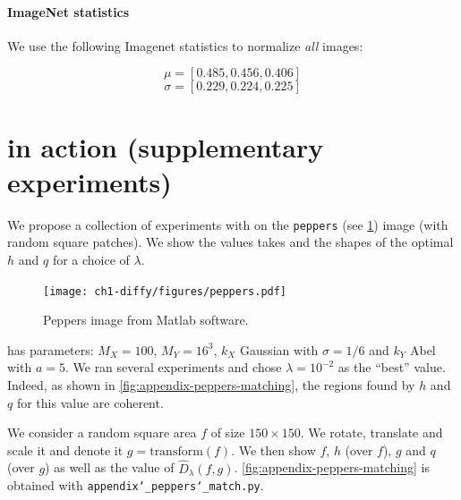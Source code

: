 \paragraph{ImageNet statistics}
We use the following Imagenet statistics to normalize \emph{all} images:

$$ \mu = [0.485, 0.456, 0.406]$$
$$ \sigma =[0.229, 0.224, 0.225]$$

\section{\Diffy in action (supplementary experiments)} \label{app:additional-experiments}

We propose a collection of experiments with \Diffy on the \texttt{peppers} (see \cref{fig:peppers}) image (with random square patches). We show the values \Diffy takes and the shapes of the optimal $h$ and $q$ for a choice of $\lambda$.


\begin{figure}[!h]
    \centering
    \texttt{[image: ch1-diffy/figures/peppers.pdf]}
    \caption[Sample image for Diffy experiments.]{Peppers image from Matlab software.}
    \label{fig:peppers}
\end{figure}

\Diffy has parameters: $M_X = 100$, $M_Y = 16^3$, $k_X$ Gaussian with $\sigma = 1/6$ and $k_Y$ Abel with $a=5$. We ran several experiments and chose $\lambda = 10^{-2}$ as the ``best'' value. Indeed, as shown in \cref{fig:appendix-peppers-matching}, the regions found by $h$ and $q$ for this value are coherent.

We consider a random square area $f$ of size $150 \times 150$. We rotate, translate and scale it and denote it $g = \textrm{transform}(f)$. We then show $f$, $h$ (over $f$), $g$ and $q$ (over $g$) as well as the value of $\widehat D_\lambda(f, g)$. \cref{fig:appendix-peppers-matching} is obtained with \texttt{appendix\char`_peppers\char`_match.py}.

